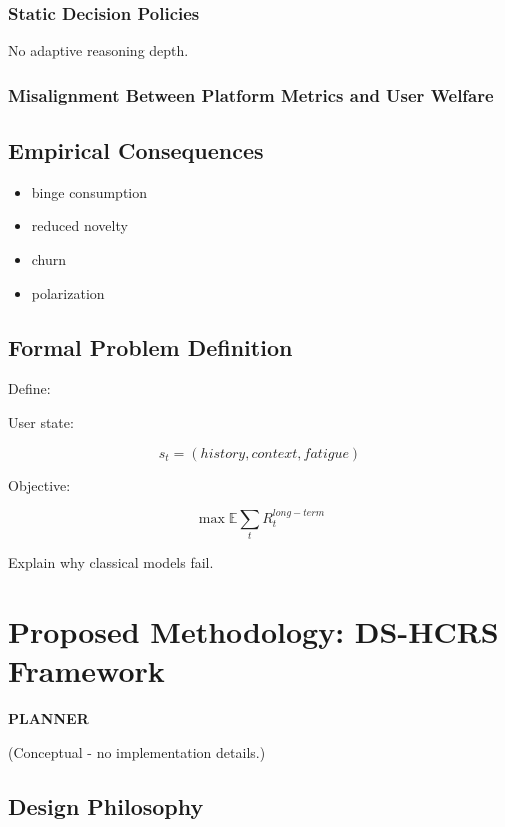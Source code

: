 \documentclass[lettersize,journal]{IEEEtran}
\begin{document}
\subsubsection{Static Decision Policies}

No adaptive reasoning depth.

\subsubsection{Misalignment Between Platform Metrics and User Welfare}

\subsection{Empirical Consequences}

\begin{itemize}
    \item binge consumption    
    \item reduced novelty
    \item churn
    \item polarization
\end{itemize}
    
\subsection{Formal Problem Definition}

Define:

User state:

\begin{equation}
    s_t = (history, context, fatigue)
\end{equation}

Objective:

\begin{equation}
    \max \mathbb{E} \sum_{t} R_{t}^{long-term}  
\end{equation}

Explain why classical models fail.

% 
\section{Proposed Methodology: DS-HCRS Framework}

\textbf{PLANNER}

(Conceptual - no implementation details.)

\subsection{Design Philosophy}
\end{document}
